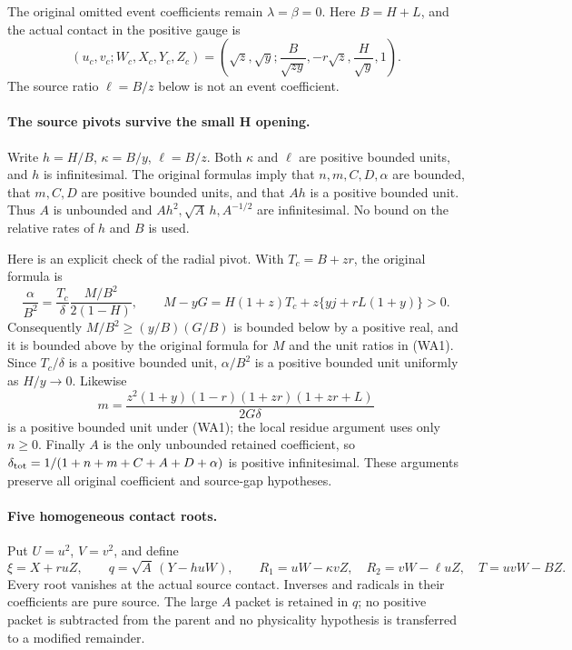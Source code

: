 The original omitted event coefficients remain $\lambda=\beta=0$.
Here $B=H+L$, and the actual contact in the positive gauge is
\[
 (u_c,v_c;W_c,X_c,Y_c,Z_c)
 =\left(\sqrt z,\sqrt y;\frac B{\sqrt{zy}},
                  -r\sqrt z,\frac H{\sqrt y},1\right).
\]
The source ratio $\ell=B/z$ below is not an event coefficient.

\paragraph{The source pivots survive the small H opening.}
Write $h=H/B$, $\kappa=B/y$, $\ell=B/z$. Both $\kappa$ and
$\ell$ are positive bounded units, and $h$ is infinitesimal.
The original formulas imply that $n,m,C,D,\alpha$ are bounded,
that $m,C,D$ are positive bounded units, and that $Ah$ is a
positive bounded unit. Thus $A$ is unbounded and
$Ah^2,\sqrt A\,h,A^{-1/2}$ are infinitesimal. No bound on the
relative rates of $h$ and $B$ is used.

Here is an explicit check of the radial pivot. With $T_c=B+zr$,
the original formula is
\[
 \frac\alpha{B^2}
   =\frac{T_c}{\delta}\frac{M/B^2}{2(1-H)},\qquad
 M-yG=H(1+z)T_c+z\{yj+rL(1+y)\}>0.                  \tag{WA2}
\]
Consequently $M/B^2\ge(y/B)(G/B)$ is bounded below by a
positive real, and it is bounded above by the original formula
for $M$ and the unit ratios in (WA1). Since $T_c/\delta$ is a
positive bounded unit, $\alpha/B^2$ is a positive bounded unit
uniformly as $H/y\to0$. Likewise
\[
 m=\frac{z^2(1+y)(1-r)(1+zr)(1+zr+L)}{2G\delta}
\]
is a positive bounded unit under (WA1); the local residue argument
uses only $n\ge0$. Finally $A$ is the only unbounded retained coefficient, so
$\delta_{\rm tot}=1/(1+n+m+C+A+D+\alpha)$ is positive
infinitesimal. These arguments preserve all original coefficient
and source-gap hypotheses.

\paragraph{Five homogeneous contact roots.}
Put $U=u^2$, $V=v^2$, and define
\[
 \xi=X+ruZ,\qquad q=\sqrt A\,(Y-huW),\qquad
 R_1=uW-\kappa vZ,\quad R_2=vW-\ell uZ,\quad
 T=uvW-BZ.                                             \tag{WA3}
\]
Every root vanishes at the actual source contact. Inverses and
radicals in their coefficients are pure source. The large $A$
packet is retained in $q$; no positive packet is subtracted from
the parent and no physicality hypothesis is transferred to a
modified remainder.

